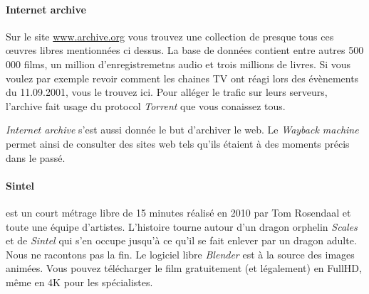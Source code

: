 \paragraph{Internet archive}
Sur le site \url{www.archive.org} vous trouvez une collection de presque tous ces \oe uvres libres mentionnées ci dessus.
La base de données contient entre autres 500 000 films, un million d'enregistremetns audio et trois millions de livres.
Si vous voulez par exemple revoir comment les chaines TV ont réagi lors des évènements du 11.09.2001, vous le trouvez ici.
Pour alléger le trafic sur leurs serveurs, l'archive fait usage du protocol \textit{Torrent} que vous conaissez tous.

\textit{Internet archive} s'est aussi donnée le but d'archiver le web. Le \textit{Wayback machine} permet ainsi de consulter des sites web tels qu'ils étaient à des moments précis dans le passé.

\paragraph{Sintel}
est un court métrage libre de 15 minutes réalisé en 2010 par Tom Rosendaal et toute une équipe d'artistes.
L'histoire tourne autour d'un dragon orphelin \textit{Scales} et de \textit{Sintel} qui s'en occupe jusqu'à ce qu'il se fait enlever par un dragon adulte.
Nous ne racontons pas la fin. Le logiciel libre \textit{Blender} est à la source des images animées.
Vous pouvez télécharger le film gratuitement (et légalement) en FullHD, même en 4K pour les spécialistes.


	
		
	
